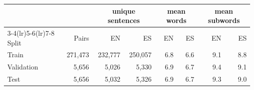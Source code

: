 \begin{tabular}{lrrrrrrr}
\toprule
& & \multicolumn{2}{c}{unique sentences} & \multicolumn{2}{c}{mean words} & \multicolumn{2}{c}{mean subwords} \\
\cmidrule(lr){3-4}\cmidrule(lr){5-6}\cmidrule(lr){7-8}
Split & Pairs & EN & ES & EN & ES & EN & ES \\
\midrule
Train & 271,473 & 232,777 & 250,057 & 6.8 & 6.6 & 9.1 & 8.8 \\
Validation & 5,656 & 5,026 & 5,330 & 6.9 & 6.7 & 9.4 & 9.1 \\
Test & 5,656 & 5,032 & 5,326 & 6.9 & 6.7 & 9.3 & 9.0 \\
\bottomrule
\end{tabular}
